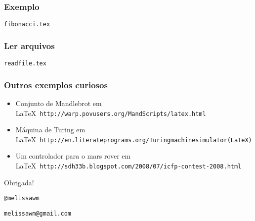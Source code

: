 \documentclass{beamer}
\newcommand{\code}[1]{\texttt{#1}}
\begin{document}
\begin{frame}
   \frametitle{Exemplo}
   \begin{center}
      \begin{block}{}
         \begin{center}
            \code{fibonacci.tex}
         \end{center}
      \end{block}
   \end{center}
\end{frame}
\begin{frame}
   \frametitle{Ler arquivos}
   \begin{center}
      \begin{block}{}
         \begin{center}
            \code{readfile.tex}
         \end{center}
      \end{block}
   \end{center}
\end{frame}
\begin{frame}
   \frametitle{Outros exemplos curiosos}
   \begin{itemize}
      \item Conjunto de Mandlebrot em \LaTeX\ {\footnotesize{\code{http://warp.povusers.org/MandScripts/latex.html}}}
      \item Máquina de Turing em \LaTeX\ {\footnotesize{\code{http://en.literateprograms.org/Turing\underline{}machine\underline{}simulator\underline{}(LaTeX)}}}
      \item Um controlador para o mars rover em \LaTeX\ {\footnotesize{\code{http://sdh33b.blogspot.com/2008/07/icfp-contest-2008.html}}}
   \end{itemize}
\end{frame}
\begin{frame}
   \begin{center}
      \Huge{Obrigada!}
   \end{center}

   \vspace{2cm}
   \begin{center}
      \Large{
      \code{@melissawm}

      \code{melissawm@gmail.com}
   }
   \end{center}
\end{frame}
\end{document}
